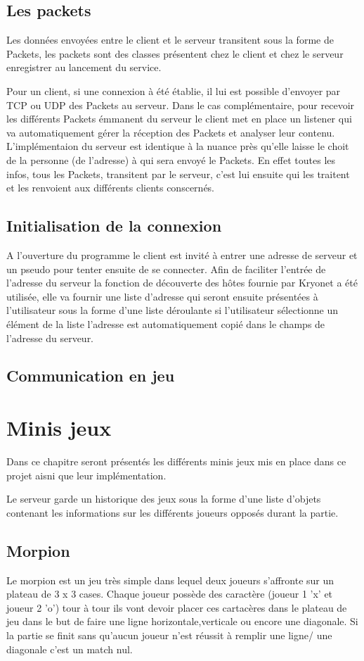 \documentclass{report}
\begin{document}
\section{Les packets}
Les données envoyées entre le client et le serveur transitent sous la forme de Packets, les packets sont des classes présentent
chez le client et chez le serveur enregistrer au lancement du service.

Pour un client, si une connexion à été établie, il lui est possible d'envoyer par TCP ou UDP des Packets au serveur. Dans le cas complémentaire,
pour recevoir les différents Packets émmanent du serveur le client met en place un listener qui va automatiquement gérer la réception des Packets et analyser leur contenu.
L'implémentaion du serveur est identique à la nuance près qu'elle laisse le choit de la personne (de l'adresse) à qui sera envoyé le Packets. En effet toutes les infos, tous les Packets,
transitent par le serveur, c'est lui ensuite qui les traitent et les renvoient aux différents clients conscernés.

\section{Initialisation de la connexion}
A l'ouverture du programme le client est invité à entrer une adresse de serveur et un pseudo pour tenter ensuite de se connecter. Afin de faciliter l'entrée de l'adresse du serveur la fonction de
découverte des hôtes fournie par Kryonet a été utilisée, elle va fournir une liste d'adresse qui seront ensuite présentées à l'utilisateur sous la forme d'une liste déroulante
si l'utilisateur sélectionne un élément de la liste l'adresse est automatiquement copié dans le champs de l'adresse du serveur.

\section{Communication en jeu}

\chapter{Minis jeux}
Dans ce chapitre seront présentés les différents minis jeux mis en place dans ce projet aisni que leur implémentation.

Le serveur garde un historique des jeux sous la forme d'une liste d'objets contenant les informations sur les différents joueurs opposés durant la partie.

\section{Morpion}
Le morpion est un jeu très simple dans lequel deux joueurs s'affronte sur un plateau de 3 x 3 cases. Chaque joueur possède des caractère (joueur 1 'x' et joueur 2 'o')
tour à tour ils vont devoir placer ces cartacères dans le plateau de jeu dans le but de faire une ligne horizontale,verticale ou encore une diagonale.
Si la partie se finit sans qu'aucun joueur n'est réussit à remplir une ligne/ une diagonale c'est un match nul.
\end{document}
